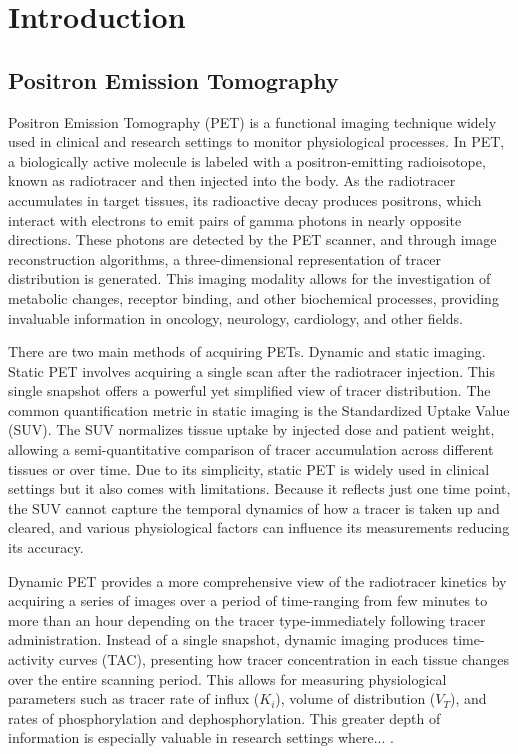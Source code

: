 \chapter{Introduction}
\section{Positron Emission Tomography}
Positron Emission Tomography (PET) is a functional imaging technique widely used in clinical and research settings to monitor physiological processes.
In PET, a biologically active molecule is labeled with a positron-emitting radioisotope, known as radiotracer and then injected into the body.
As the radiotracer accumulates in target tissues, its radioactive decay produces positrons, which interact with electrons to emit pairs of gamma photons in nearly opposite directions.
These photons are detected by the PET scanner, and through image reconstruction algorithms, a three-dimensional representation of tracer distribution is generated.
This imaging modality allows for the investigation of metabolic changes, receptor binding, and other biochemical processes, providing invaluable information in oncology, neurology, cardiology, and other fields.

There are two main methods of acquiring PETs.
Dynamic and static imaging.
Static PET involves acquiring a single scan after the radiotracer injection.
This single snapshot offers a powerful yet simplified view of tracer distribution.
The common quantification metric in static imaging is the Standardized Uptake Value (SUV).
The SUV normalizes tissue uptake by injected dose and patient weight, allowing a semi-quantitative comparison of tracer accumulation across different tissues or over time. \cite{TODO}
Due to its simplicity, static PET is widely used in clinical settings but it also comes with limitations.
Because it reflects just one time point, the SUV cannot capture the temporal dynamics of how a tracer is taken up and cleared, and various physiological factors can influence its measurements reducing its accuracy.


Dynamic PET provides a more comprehensive view of the radiotracer kinetics by acquiring a series of images over a period of time-ranging from few minutes to more than an hour depending on the tracer type-immediately following tracer administration.
Instead of a single snapshot, dynamic imaging produces time-activity curves (TAC), presenting how tracer concentration in each tissue changes over the entire scanning period.
This allows for measuring physiological parameters such as tracer rate of influx (\(K_i\)), volume of distribution (\(V_T\)), and rates of phosphorylation and dephosphorylation.
This greater depth of information is especially valuable in research settings where... .

